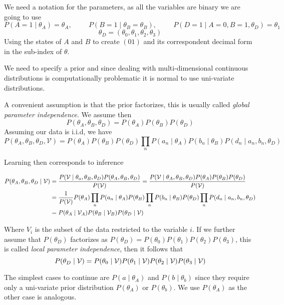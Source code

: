 We need a notation for the parameters, as all the variables are binary we are
going to use
\[
  P(A = 1 \mid \theta_{A}) = \theta_{A}, \hspace{1cm} P(B = 1 \mid \theta_{B} = \theta_{B}), \hspace{1cm} P(D = 1 \mid A = 0, B = 1, \theta_{D}) = \theta_{1}
\]
\[\theta_{D} = (\theta_{0}, \theta_{1}, \theta_{2}, \theta_{3})\]
Using the states of \(A\) and \(B\) to create \((01)\) and its correspondent
decimal form in the sub-index of \(\theta\).

We need to specify a prior and since dealing with multi-dimensional continuous
distributions is computationally problematic it is normal to use uni-variate
distributions.

A convenient assumption is that the prior factorizes, this is usually called
\emph{global parameter independence}. We assume then
\[
  P(\theta_{A}, \theta_{B}, \theta_{D}) = P(\theta_{A})P(\theta_{B})P(\theta_{D})
\]
Assuming our data is i.i.d, we have
\[
  P(\theta_{A}, \theta_{B}, \theta_{D}, \mathcal{V}) = P(\theta_{A})P(\theta_{B})P(\theta_{D})\prod_{n}P(a_{n}\mid \theta_{A})P(b_{n} \mid \theta_{B})P(d_{n}\mid a_{n}, b_{n}, \theta_{D})
\]

Learning then corresponds to inference

\[
  \begin{aligned}
    P(\theta_{A}, \theta_{B}, \theta_{D}\mid \mathcal{V}) &= \frac{P(\mathcal{V} \mid \theta_{a}, \theta_{B}, \theta_{D})P(\theta_{A}, \theta_{B}, \theta_{D})}{P(\mathcal{V})} =\frac{P(\mathcal{V} \mid \theta_{A}, \theta_{B}, \theta_{D})P(\theta_{A}) P(\theta_{B})P( \theta_{D})}{P(\mathcal{V})}\\
    &= \frac{1}{P(\mathcal{V})}P(\theta_{A})\prod_{n}P(a_{n}\mid \theta_{A})P(\theta_{B})\prod_{n}P(b_{n}\mid \theta_{B})P(\theta_{D})\prod_{n}P(d_{n}\mid a_{n}, b_{n},\theta_{D})\\
    &= P(\theta_{A} \mid \mathcal{V}_{A} )P(\theta_{B}\mid \mathcal{V}_{B})P(\theta_{D} \mid \mathcal{V})
  \end{aligned}
\]

Where \(V_{i}\) is the subset of the data restricted to the variable \(i\). If
we further assume that \(P(\theta_{D})\) factorizes as
\(P(\theta_{D}) = P(\theta_{0})P(\theta_{1})P(\theta_{2})P(\theta_{3})\),
this is called \emph{local parameter independence}, then it follows that
\[
  P(\theta_{D}\mid \mathcal{V}) = P(\theta_{0} \mid \mathcal{V} )P(\theta_{1} \mid \mathcal{V} )P(\theta_{2} \mid \mathcal{V} )P(\theta_{3} \mid \mathcal{V} )
\]

The simplest cases to continue are \(P(a\mid \theta_{A})\) and
\(P(b \mid \theta_{b})\) since they require only a uni-variate prior distribution
\(P(\theta_{A})\) or \(P(\theta_{b})\). We use \(P(\theta_{A})\) as the other
case is analogous.

